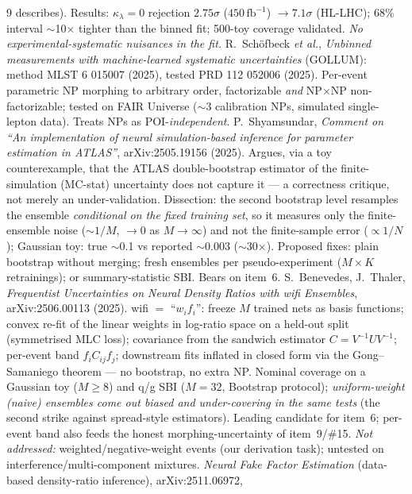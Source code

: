 \documentclass[11pt]{article}
\newcommand{\kl}{\ensuremath{\kappa_\lambda}}
\begin{document}
\begin{thebibliography}{9}
  describes). Results: \kl$=0$ rejection $2.75\sigma$ ($450\,\mathrm{fb}^{-1}$) $\to 7.1\sigma$ (HL-LHC); 68\%
  interval $\sim$10$\times$ tighter than the binned fit; 500-toy coverage validated. \emph{No experimental-systematic
  nuisances in the fit.}
 R.~Schöfbeck \emph{et al.}, \emph{Unbinned measurements with machine-learned systematic
  uncertainties} (GOLLUM): method MLST 6 015007 (2025), tested PRD 112 052006 (2025). Per-event parametric NP
  morphing to arbitrary order, factorizable \emph{and} NP$\times$NP non-factorizable; tested on FAIR Universe
  ($\sim$3 calibration NPs, simulated single-lepton data). Treats NPs as POI-\emph{independent}.
 P.~Shyamsundar, \emph{Comment on ``An implementation of neural simulation-based inference for
  parameter estimation in ATLAS''}, arXiv:2505.19156 (2025). Argues, via a toy counterexample, that the ATLAS
  double-bootstrap estimator of the finite-simulation (MC-stat) uncertainty does not capture it --- a correctness
  critique, not merely an under-validation. Dissection: the second bootstrap level resamples the ensemble
  \emph{conditional on the fixed training set}, so it measures only the finite-ensemble noise ($\sim1/M$, $\to0$
  as $M\to\infty$) and not the finite-sample error ($\propto1/N$); Gaussian toy: true $\sim$0.1 vs reported
  $\sim$0.003 ($\sim$30$\times$). Proposed fixes: plain bootstrap without merging; fresh ensembles per
  pseudo-experiment ($M\times K$ retrainings); or summary-statistic SBI. Bears on item~6.
 S.~Benevedes, J.~Thaler, \emph{Frequentist Uncertainties on Neural Density Ratios with wifi
  Ensembles}, arXiv:2506.00113 (2025). wifi $=$ ``$w_if_i$'': freeze $M$ trained nets as basis functions; convex
  re-fit of the linear weights in log-ratio space on a held-out split (symmetrised MLC loss); covariance from the
  sandwich estimator $C=V^{-1}UV^{-1}$; per-event band $f_i C_{ij} f_j$; downstream fits inflated in closed form
  via the Gong--Samaniego theorem --- no bootstrap, no extra NP. Nominal coverage on a Gaussian toy ($M\ge8$) and
  q/g SBI ($M=32$, Bootstrap protocol); \emph{uniform-weight (naive) ensembles come out biased and under-covering
  in the same tests} (the second strike against spread-style estimators). Leading candidate for item~6; per-event
  band also feeds the honest morphing-uncertainty of item~9/\#15. \emph{Not addressed:} weighted/negative-weight
  events (our derivation task); untested on interference/multi-component mixtures.
 \emph{Neural Fake Factor Estimation} (data-based density-ratio inference), arXiv:2511.06972,

\end{thebibliography}
\end{document}
